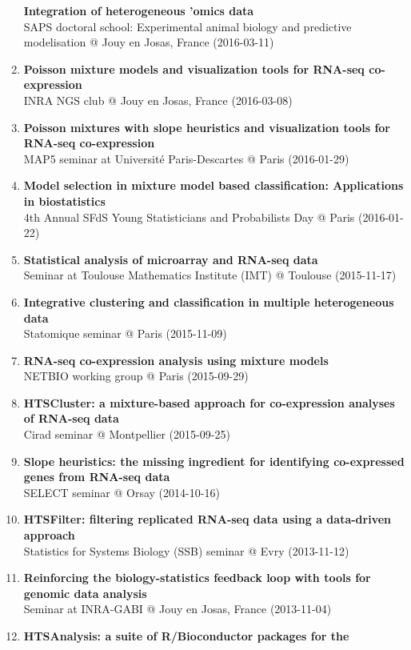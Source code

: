 \documentclass[11pt, a4paper]{awesome-cv}
\begin{document}
\begin{enumerate}
  \textbf{Integration of heterogeneous 'omics data}\\
  SAPS doctoral school: Experimental animal biology and predictive
  modelisation @ Jouy en Josas, France (2016-03-11)
\item
  \textbf{Poisson mixture models and visualization tools for RNA-seq
  co-expression}\\
  INRA NGS club @ Jouy en Josas, France (2016-03-08)
\item
  \textbf{Poisson mixtures with slope heuristics and visualization tools
  for RNA-seq co-expression}\\
  MAP5 seminar at Université Paris-Descartes @ Paris (2016-01-29)
\item
  \textbf{Model selection in mixture model based classification:
  Applications in biostatistics}\\
  4th Annual SFdS Young Statisticians and Probabilists Day @ Paris
  (2016-01-22)
\item
  \textbf{Statistical analysis of microarray and RNA-seq data}\\
  Seminar at Toulouse Mathematics Institute (IMT) @ Toulouse
  (2015-11-17)
\item
  \textbf{Integrative clustering and classification in multiple
  heterogeneous data}\\
  Statomique seminar @ Paris (2015-11-09)
\item
  \textbf{RNA-seq co-expression analysis using mixture models}\\
  NETBIO working group @ Paris (2015-09-29)
\item
  \textbf{HTSCluster: a mixture-based approach for co-expression
  analyses of RNA-seq data}\\
  Cirad seminar @ Montpellier (2015-09-25)
\item
  \textbf{Slope heuristics: the missing ingredient for identifying
  co-expressed genes from RNA-seq data}\\
  SELECT seminar @ Orsay (2014-10-16)
\item
  \textbf{HTSFilter: filtering replicated RNA-seq data using a
  data-driven approach}\\
  Statistics for Systems Biology (SSB) seminar @ Evry (2013-11-12)
\item
  \textbf{Reinforcing the biology-statistics feedback loop with tools
  for genomic data analysis}\\
  Seminar at INRA-GABI @ Jouy en Josas, France (2013-11-04)
\item
  \textbf{HTSAnalysis: a suite of R/Bioconductor packages for the
}
\end{enumerate}
\end{document}
